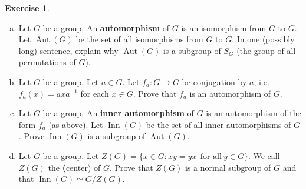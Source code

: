 \documentclass[11pt,oneside]{article}
\numberwithin{equation}{section}
\theoremstyle{definition}
\newtheorem{exercise}{Exercise}
\def\Aut{\operatorname{Aut}}
\def\Inn{\operatorname{Inn}}
\begin{document}
\begin{exercise}
  \begin{enumerate}[(a)]
  \item
    Let $G$ be a group.  An \textbf{automorphism} of $G$ is an
    isomorphism from $G$ to $G$. Let $\Aut(G)$ be the set of all
    isomorphisms from $G$ to $G$. In one (possibly long) sentence,
    explain why $\Aut(G)$ is a subgroup of $S_G$ (the group of all permutations of $G$).
  \item
    Let $G$ be a group.  Let $a \in G$.  Let $f_a : G \to G$ be
    conjugation by $a$, i.e. $f_a(x) = a x a^ {-1}$ for each $x \in G$.
    Prove that $f_a$ is an automorphism of $G$.
  \item
    Let $G$ be a group.  An \textbf{inner automorphism} of $G$ is an
    automorphism of the form $f_a$ (as above). Let $\Inn(G) $ be the
    set of all inner automorphisms of $G$. Prove $\Inn(G)$ is a subgroup of
    $ \Aut(G)$.
  \item
    Let $G$ be a group. Let $Z(G) = \{ x \in G : xy = yx \ \ \text{for
      all} \ y \in G \}$.  We call $Z(G)$ the \textbf(center) of $G$.
    Prove that $Z(G)$ is a normal subgroup of $G$ and that $\Inn(G) \simeq G / Z(G)$.
  \end{enumerate}
\end{exercise}
\end{document}
